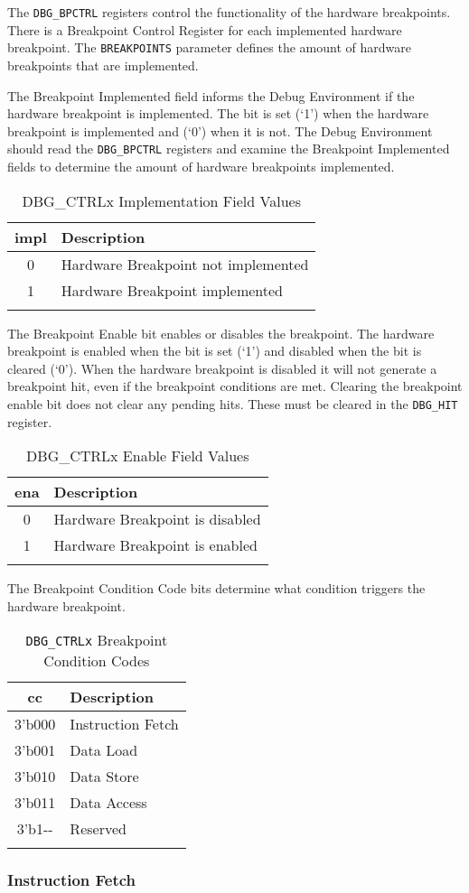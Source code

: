 The \texttt{DBG\_BPCTRL} registers control the functionality of the hardware
breakpoints. There is a Breakpoint Control Register for each implemented
hardware breakpoint. The \texttt{BREAKPOINTS} parameter defines the amount of
hardware breakpoints that are implemented.

The Breakpoint Implemented field informs the Debug Environment if the
hardware breakpoint is implemented. The bit is set (`1') when the
hardware breakpoint is implemented and (`0') when it is not. The Debug
Environment should read the \texttt{DBG\_BPCTRL} registers and examine the
Breakpoint Implemented fields to determine the amount of hardware
breakpoints implemented.

\begin{longtable}[]{@{}cl@{}}
\toprule
impl & Description\tabularnewline
\midrule
\endhead
0 & Hardware Breakpoint not implemented\tabularnewline
1 & Hardware Breakpoint implemented\tabularnewline
\bottomrule
\caption{DBG\_CTRLx Implementation Field Values}
\end{longtable}


The Breakpoint Enable bit enables or disables the breakpoint. The
hardware breakpoint is enabled when the bit is set (`1') and disabled
when the bit is cleared (`0'). When the hardware breakpoint is disabled
it will not generate a breakpoint hit, even if the breakpoint conditions
are met. Clearing the breakpoint enable bit does not clear any pending
hits. These must be cleared in the \texttt{DBG\_HIT} register.

\begin{longtable}[]{@{}cl@{}}
\toprule
ena & Description\tabularnewline
\midrule
\endhead
0 & Hardware Breakpoint is disabled\tabularnewline
1 & Hardware Breakpoint is enabled\tabularnewline
\bottomrule
\caption{DBG\_CTRLx Enable Field Values}
\end{longtable}


The Breakpoint Condition Code bits determine what condition triggers the
hardware breakpoint.

\begin{longtable}[]{@{}cl@{}}
\toprule
cc & Description\tabularnewline
\midrule
\endhead
3'b000 & Instruction Fetch\tabularnewline
3'b001 & Data Load\tabularnewline
3'b010 & Data Store\tabularnewline
3'b011 & Data Access\tabularnewline
3'b1-\/- & Reserved\tabularnewline
\bottomrule
\caption{\texttt{DBG\_CTRLx} Breakpoint Condition Codes}
\end{longtable} 

\subsubsection{Instruction Fetch}\label{instruction-fetch}

